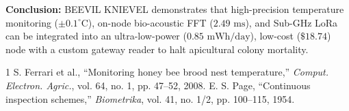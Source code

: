 \documentclass[10pt,conference,letterpaper]{IEEEtran}
\begin{document}
\textbf{Conclusion:} BEEVIL KNIEVEL demonstrates that high-precision temperature monitoring ($\pm 0.1^\circ\text{C}$), on-node bio-acoustic FFT ($2.49\text{ ms}$), and Sub-GHz LoRa can be integrated into an ultra-low-power ($0.85\text{ mWh/day}$), low-cost ($\$18.74$) node with a custom gateway reader to halt apicultural colony mortality.

\begin{thebibliography}{1}
 S. Ferrari et al., ``Monitoring honey bee brood nest temperature,'' \textit{Comput. Electron. Agric.}, vol. 64, no. 1, pp. 47--52, 2008.
 E. S. Page, ``Continuous inspection schemes,'' \textit{Biometrika}, vol. 41, no. 1/2, pp. 100--115, 1954.
\end{thebibliography}
\end{document}
